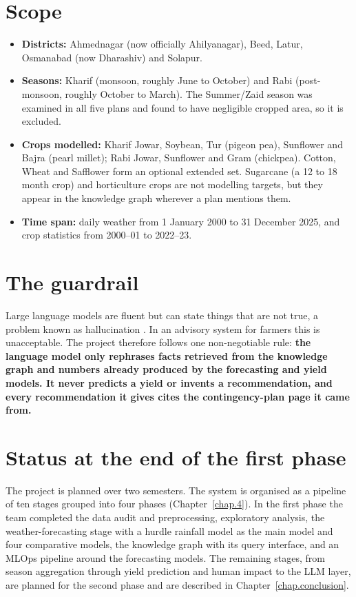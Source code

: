 \section{Scope}
\begin{itemize}
	\item \textbf{Districts:} Ahmednagar (now officially Ahilyanagar), Beed, Latur, Osmanabad (now Dharashiv) and Solapur.
	\item \textbf{Seasons:} Kharif (monsoon, roughly June to October) and Rabi (post-monsoon, roughly October to March). The Summer/Zaid season was examined in all five plans and found to have negligible cropped area, so it is excluded.
	\item \textbf{Crops modelled:} Kharif Jowar, Soybean, Tur (pigeon pea), Sunflower and Bajra (pearl millet); Rabi Jowar, Sunflower and Gram (chickpea). Cotton, Wheat and Safflower form an optional extended set. Sugarcane (a 12 to 18 month crop) and horticulture crops are not modelling targets, but they appear in the knowledge graph wherever a plan mentions them.
	\item \textbf{Time span:} daily weather from 1 January 2000 to 31 December 2025, and crop statistics from 2000--01 to 2022--23.
\end{itemize}

\section{The guardrail}
Large language models are fluent but can state things that are not true, a problem known as hallucination \cite{ji2023survey}. In an advisory system for farmers this is unacceptable. The project therefore follows one non-negotiable rule: \textbf{the language model only rephrases facts retrieved from the knowledge graph and numbers already produced by the forecasting and yield models. It never predicts a yield or invents a recommendation, and every recommendation it gives cites the contingency-plan page it came from.}

\section{Status at the end of the first phase}
The project is planned over two semesters. The system is organised as a pipeline of ten stages grouped into four phases (Chapter~\ref{chap.4}). In the first phase the team completed the data audit and preprocessing, exploratory analysis, the weather-forecasting stage with a hurdle rainfall model as the main model and four comparative models, the knowledge graph with its query interface, and an MLOps pipeline around the forecasting models. The remaining stages, from season aggregation through yield prediction and human impact to the LLM layer, are planned for the second phase and are described in Chapter~\ref{chap.conclusion}.

